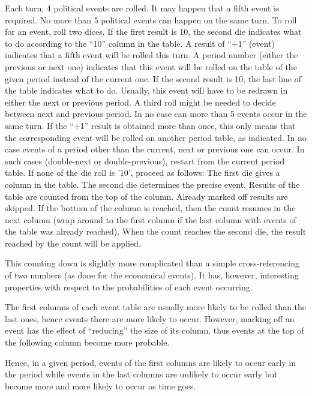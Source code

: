 \aparag Each turn, 4 political events are rolled. It may happen that a
fifth event is required. No more than 5 political events can happen on
the same turn.
\aparag To roll for an event, roll two dices.
\aparag If the first result is 10, the second die indicates what to do
according to the ``10'' column in the table.
\bparag A result of ``+1'' (event) indicates that a fifth event will be
rolled this turn.
\bparag A period number (either the previous or next one) indicates that
this event will be rolled on the table of the given period instead of
the current one.
\aparag If the second result is 10, the last line of the table indicates
what to do.
\bparag Usually, this event will have to be redrawn in either the next
or previous period. A third roll might be needed to decide between next
and previous period.
\aparag In no case can more than 5 events occur in the same turn. If the
``+1'' result is obtained more than once, this only means that the
corresponding event will be rolled on another period table, as
indicated.
\aparag In no case events of a period other than the current, next or
previous one can occur.
\bparag In such cases (double-next or double-previous), restart from the
current period table.
\aparag If none of the die roll is '10', proceed as follows:
\bparag The first die gives a column in the table.
\bparag The second die determines the precise event.
\bparag Results of the table are counted from the top of the column.
\bparag Already marked off results are skipped.
\bparag If the bottom of the column is reached, then the count resumes
in the next column (wrap around to the first column if the last column
with events of the table was already reached).
\bparag When the count reaches the second die, the result reached by the
count will be applied.
\begin{designnote}
  This counting down is slightly more complicated than a simple
  cross-referencing of two numbers (as done for the economical
  events). It has, however, interesting properties with respect to the
  probabilities of each event occurring.

  The first columns of each event table are usually more likely to be
  rolled than the last ones, hence events there are more likely to
  occur. However, marking off an event has the effect of ``reducing''
  the size of its column, thus events at the top of the following column
  become more probable.

  Hence, in a given period, events of the first columns are likely to
  occur early in the period while events in the last columns are
  unlikely to occur early but become more and more likely to occur as
  time goes.
\end{designnote}
